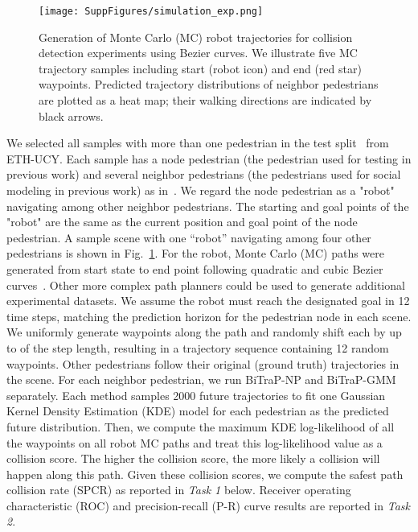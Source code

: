 \documentclass[letterpaper, 10 pt, conference]{ieeeconf}
\begin{document}
\begin{figure}[htbp]
    \centering
    \texttt{[image: SuppFigures/simulation\_exp.png]}
    \caption{Generation of Monte Carlo (MC) robot trajectories for collision detection experiments using Bezier curves. We illustrate five MC trajectory samples including start (robot icon) and end (red star) waypoints. Predicted trajectory distributions of neighbor pedestrians are plotted as a heat map; their walking directions are indicated by black arrows.}
    \label{fig:simulation_exp}
\end{figure}

 We selected all samples with more than one pedestrian in the test split~\cite{gupta2018social} from ETH-UCY. Each sample has a node pedestrian (the pedestrian used for testing in previous work) and several neighbor pedestrians (the pedestrians used for social modeling in previous work) as
in~\cite{gupta2018social,salzmann2020trajectron++}. 
We regard the node pedestrian as a "robot" navigating among other neighbor pedestrians. The starting and goal points of the "robot" are the same as the current position and goal point of the node pedestrian. A sample scene with one ``robot'' navigating among four other pedestrians is shown in Fig.~\ref{fig:simulation_exp}. For the robot,  Monte Carlo (MC) paths were generated from start state to end point following quadratic and cubic Bezier curves~\cite{gallier2000curves}. Other more complex path planners could be used to generate additional experimental datasets. We assume the robot must reach the designated goal in 12 time steps, matching the prediction horizon for the pedestrian node in each scene. We uniformly generate waypoints along the path and randomly shift each by up to  of the step length, resulting in a trajectory sequence containing 12 random waypoints. Other pedestrians follow their original (ground truth) trajectories in the scene. For each neighbor pedestrian, we run BiTraP-NP and BiTraP-GMM separately. Each method samples 2000 future trajectories to fit one Gaussian Kernel Density Estimation (KDE) model for each pedestrian as the predicted future distribution. 
Then, we compute the maximum KDE log-likelihood of all the waypoints on all robot MC paths and treat this log-likelihood value as a collision score. The higher the collision score, the more likely a collision will happen along this path. Given these collision scores, we compute the safest path collision rate (SPCR) as reported in \textit{Task 1} below.  Receiver operating characteristic (ROC) and precision-recall (P-R) curve results are reported in \textit{Task 2}. 
\end{document}
